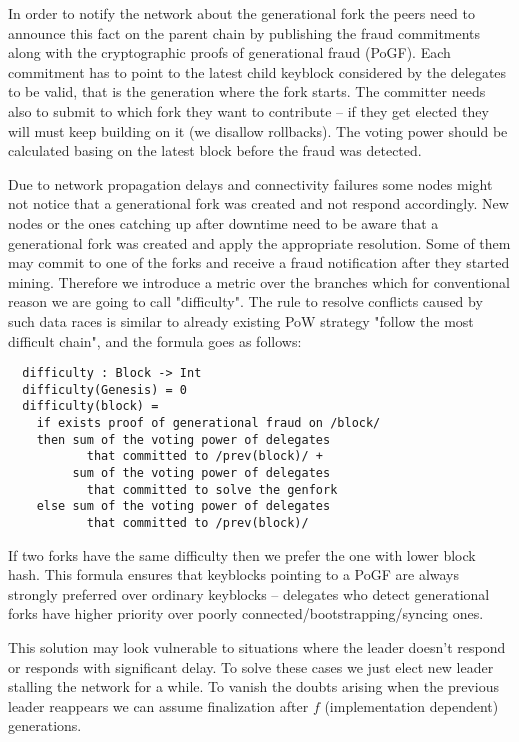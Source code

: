 In order to notify the network about the generational fork the peers need to announce
this fact on the parent chain by publishing the fraud commitments along with the
cryptographic proofs of generational fraud (PoGF). Each commitment has to point to
the latest child keyblock considered by the delegates to be
valid, that is the generation where the fork starts. The committer
needs also to submit to which fork they want to contribute – if they get elected they
will must keep building on it (we disallow rollbacks). The voting power should be
calculated basing on the latest block before the fraud was detected.

Due to network propagation
delays and connectivity failures some nodes might not notice that a generational
fork was created and not respond accordingly. New nodes or the ones catching up
after downtime need to be aware that a generational fork was created and apply
the appropriate resolution. Some of them may commit to one of the forks and receive a fraud
notification after they started mining. Therefore we introduce a metric over the
branches which for conventional reason we are going to call "difficulty". The
rule to resolve conflicts caused by such data races is similar to already
existing PoW strategy "follow the most difficult chain", and the formula goes
as follows:
\begin{minipage}{\linewidth}
\begin{lstlisting}
  difficulty : Block -> Int
  difficulty(Genesis) = 0
  difficulty(block) =
    if exists proof of generational fraud on /block/
    then sum of the voting power of delegates
           that committed to /prev(block)/ +
         sum of the voting power of delegates
           that committed to solve the genfork
    else sum of the voting power of delegates
           that committed to /prev(block)/
\end{lstlisting}
\end{minipage}

If two forks have the same difficulty then we prefer the one with lower
block hash. This formula ensures that keyblocks pointing to a PoGF are always
strongly preferred over ordinary keyblocks – delegates who detect generational
forks have higher priority over poorly connected/bootstrapping/syncing ones.

This solution may look vulnerable to situations where the leader doesn't respond
or responds with significant delay. To solve these cases we just elect new
leader stalling the network for a while. To vanish the doubts arising when the
previous leader reappears we can assume
finalization after $f$ (implementation dependent) generations.

